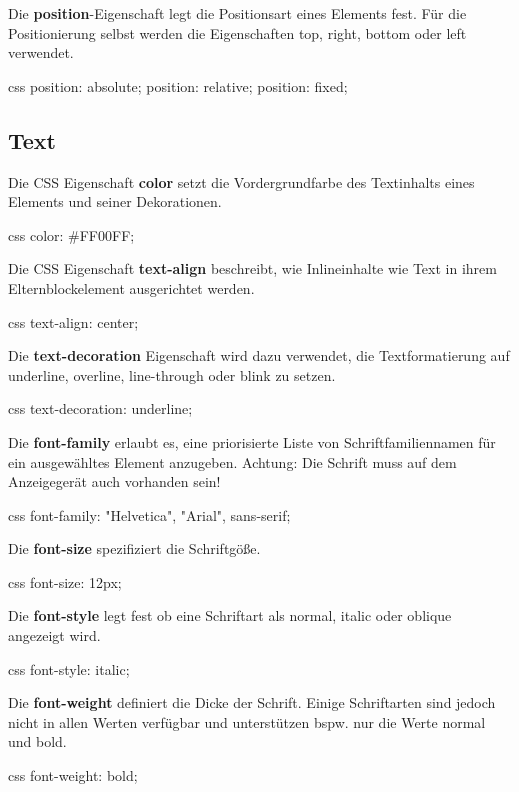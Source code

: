 \documentclass[10pt,a4paper]{article}
\begin{document}
\begin{multicols}{3}
Die \textbf{position}-Eigenschaft legt die Positionsart eines Elements fest. Für die Positionierung selbst werden die Eigenschaften top, right, bottom oder left verwendet.
\begin{codebox}{css}{}
position: absolute;
position: relative;
position: fixed;
\end{codebox}



\subsection*{Text}

Die CSS Eigenschaft \textbf{color} setzt die Vordergrundfarbe des Textinhalts eines Elements und seiner Dekorationen.
\begin{codebox}{css}{}
color: #FF00FF;
\end{codebox}

Die CSS Eigenschaft \textbf{text-align} beschreibt, wie Inlineinhalte wie Text in ihrem Elternblockelement ausgerichtet werden.
\begin{codebox}{css}{}
text-align: center;
\end{codebox}

Die \textbf{text-decoration} Eigenschaft wird dazu verwendet, die Textformatierung auf underline, overline, line-through oder blink zu setzen.
\begin{codebox}{css}{}
text-decoration: underline;
\end{codebox}

Die \textbf{font-family} erlaubt es, eine priorisierte Liste von Schriftfamiliennamen für ein ausgewähltes Element anzugeben. Achtung: Die Schrift muss auf dem Anzeigegerät auch vorhanden sein!
\begin{codebox}{css}{}
font-family: "Helvetica", "Arial", sans-serif;
\end{codebox}

Die \textbf{font-size} spezifiziert die Schriftgöße.
\begin{codebox}{css}{}
font-size: 12px;
\end{codebox}

Die \textbf{font-style} legt fest ob eine Schriftart als normal, italic oder oblique angezeigt wird.
\begin{codebox}{css}{}
font-style: italic;
\end{codebox}

Die \textbf{font-weight} definiert die Dicke der Schrift. Einige Schriftarten sind jedoch nicht in allen Werten verfügbar und unterstützen bspw. nur die Werte normal und bold.
\begin{codebox}{css}{}
font-weight: bold;
\end{codebox}




\printbibliography
{}
\end{multicols}
\end{document}
